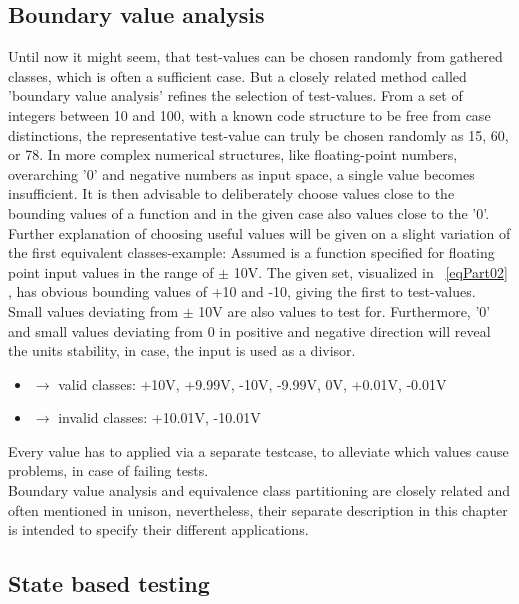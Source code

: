 	\subsection{Boundary value analysis} %
	Until now it might seem, that test-values can be chosen randomly from gathered classes, which is often a sufficient case. But a closely related method called 'boundary value analysis' refines the selection of test-values. From a set of integers between 10 and 100, with a known code structure to be free from case distinctions, the representative test-value can truly be chosen randomly as 15, 60, or 78. In more complex numerical structures, like floating-point numbers, overarching '0' and negative numbers as input space, a single value becomes insufficient. It is then advisable to deliberately choose values close to the bounding values of a function and in the given case also values close to the '0'.
	Further explanation of choosing useful values will be given on a slight variation of the first equivalent classes-example: Assumed is a function specified for floating point input values in the range of $\pm$ 10V. 
	The given set, visualized in ~\ref{eqPart02}  , has obvious bounding values of +10 and -10, giving the first to test-values. Small values deviating from $\pm$ 10V are also values to test for. Furthermore, '0' and small values deviating from 0 in positive and negative direction will reveal the units stability, in case, the input is used as a divisor. \\
	\begin{itemize}[label={}]
		\item	$\rightarrow$ valid classes: +10V, +9.99V, -10V, -9.99V, 0V, +0.01V, -0.01V \\
		\item	$\rightarrow$ invalid classes: +10.01V, -10.01V \\
	\end{itemize}
	Every value has to applied via a separate testcase, to alleviate which values cause problems, in case of failing tests. \\
	Boundary value analysis and equivalence class partitioning are closely related and often mentioned in unison, nevertheless, their separate description in this chapter is intended to specify their different applications.
		
	\subsection{State based testing}

